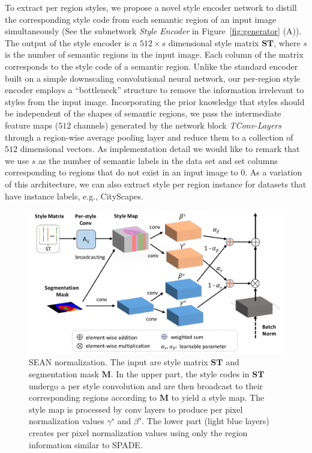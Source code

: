 \documentclass[10pt,twocolumn,letterpaper]{article}
\begin{document}
\vspace*{2mm} To extract per region styles, we propose a novel style encoder network to distill the corresponding style code from each semantic region of an input image simultaneously (See the subnetwork \emph{Style Encoder} in Figure~\ref{fig:generator} (A)).
The output of the style encoder is a $512 \times s$ dimensional style matrix $\mathbf{ST}$, where $s$ is the number of semantic regions in the input image. Each column of the matrix corresponds to the style code of a semantic region.
Unlike the standard encoder built on a simple downscaling convolutional neural network, our per-region style encoder employs a ``bottleneck'' structure to remove the information irrelevant to styles from the input image.
Incorporating the prior knowledge that styles should be independent of the shapes of semantic regions, we pass the intermediate feature maps ($512$ channels) generated by the network block \emph{TConv-Layers} through a region-wise average pooling layer and reduce them to a collection of $512$ dimensional vectors.
As implementation detail we would like to remark that we use $s$ as the number of semantic labels in the data set and set columns corresponding to regions that do not exist in an input image to $0$. As a variation of this architecture, we can also extract style per region instance for datasets that have instance labels, e.g., CityScapes.

\begin{figure}[t]
\centering
\includegraphics[width=\linewidth]{Figures/SEAN.pdf}
\caption{SEAN normalization. The input are style matrix $\mathbf{ST}$ and segmentation mask $\mathbf{M}$. In the upper part, the style codes in $\mathbf{ST}$ undergo a per style convolution and are then broadcast to their corresponding regions according to $\mathbf{M}$ to yield a style map. The style map is processed by conv layers to produce per pixel normalization values $\gamma^s$ and $\beta^s$. The lower part (light blue layers) creates per pixel normalization values using only the region information similar to SPADE.}
\label{fig:SEAN normalization}
\end{figure}
\end{document}
